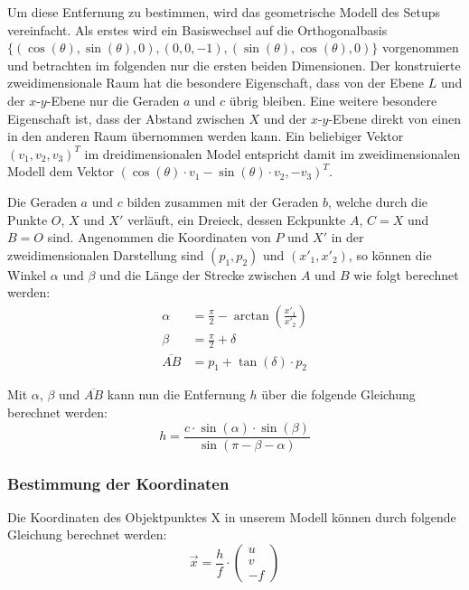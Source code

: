 \documentclass[ngerman,a4paper]{scrartcl}
\begin{document}
Um diese Entfernung zu bestimmen, wird das geometrische Modell des Setups vereinfacht. Als erstes wird ein Basiswechsel auf die Orthogonalbasis $\{(\cos(\theta), \sin(\theta), 0), (0, 0, -1), (\sin(\theta), \cos(\theta), 0)\}$ vorgenommen und betrachten im folgenden nur die ersten beiden Dimensionen. Der konstruierte zweidimensionale Raum hat die besondere Eigenschaft, dass von der Ebene $L$ und der $x$-$y$-Ebene nur die Geraden $a$ und $c$ übrig bleiben. Eine weitere besondere Eigenschaft ist, dass der Abstand zwischen $X$ und der $x$-$y$-Ebene direkt von einen in den anderen Raum übernommen werden kann. Ein beliebiger Vektor $(v_1, v_2, v_3)^T$ im dreidimensionalen Model entspricht damit im zweidimensionalen Modell dem Vektor $(\cos(\theta) \cdot v_1 - \sin(\theta) \cdot v_2, -v_3)^T$.

Die Geraden $a$ und $c$ bilden zusammen mit der Geraden $b$, welche durch die Punkte $O$, $X$ und $X'$ verläuft, ein Dreieck, dessen Eckpunkte $A$, $C = X$ und $B = O$ sind. Angenommen die Koordinaten von $P$ und $X'$ in der zweidimensionalen Darstellung sind $(p_1,p_2)$ und $(x'_1, x'_2)$, so können die Winkel $\alpha$ und $\beta$ und die Länge der Strecke zwischen $A$ und $B$ wie folgt berechnet werden:
\begin{align*}
	\alpha &= \frac{\pi}{2} - \arctan\left(\frac{x'_1}{x'_2}\right)\\
	\beta &= \frac{\pi}{2} + \delta\\
	\overline{AB} &= p_1 + \tan(\delta) \cdot p_2
\end{align*}

Mit $\alpha$, $\beta$ und $\overline{AB}$ kann nun die Entfernung $h$ über die folgende Gleichung berechnet werden:
\[ h = \frac{c \cdot \sin(\alpha) \cdot \sin(\beta)}{\sin(\pi - \beta - \alpha)} \]

\subsubsection{Bestimmung der Koordinaten}

Die Koordinaten des Objektpunktes X in unserem Modell können durch folgende Gleichung berechnet werden:
\[ \vec{x} = \frac{h}{f} \cdot \begin{pmatrix}
u \\ v \\ -f
\end{pmatrix} \]

\end{document}
